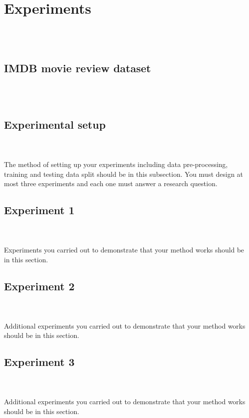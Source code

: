 \section{Experiments}
\textbf{}\\\\
\lipsum[4]

\subsection{IMDB movie review dataset}
\textbf{}\\\\
\lipsum[2]
\subsection{Experimental setup}
\textbf{}\\\\
The method of setting up your experiments including data pre-processing, training and testing data split should be in this subsection.
You must design at most three experiments and each one must answer a research question.
\subsection{Experiment 1} 
\textbf{}\\\\
Experiments you carried out to demonstrate that your method works should be in this section. 
\subsection{Experiment 2}
\textbf{}\\\\
Additional experiments you carried out to demonstrate that your method works should be in this section.
\subsection{Experiment 3}
\textbf{}\\\\
Additional experiments you carried out to demonstrate that your method works should be in this section.
